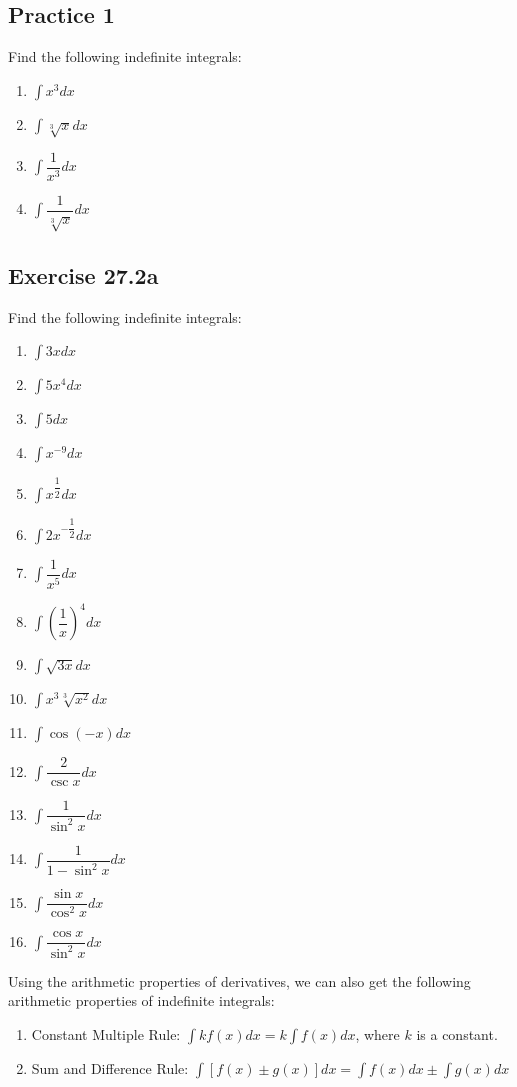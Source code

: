 \documentclass{report}
\begin{document}
\subsection{Practice 1}
Find the following indefinite integrals:
\begin{enumerate}
    \item $\displaystyle\int x^{3}dx$
    \item $\displaystyle\int{\sqrt[3]{x}}dx$
    \item $\displaystyle\int{\dfrac{1}{x^{3}}}dx$
    \item $\displaystyle\int{\dfrac{1}{\sqrt[3]{x}}}dx$
\end{enumerate}

\subsection{Exercise 27.2a}
Find the following indefinite integrals:
\begin{enumerate}
    \item $\displaystyle\int3xdx$
    \item $\displaystyle\int5x^{4}dx$
    \item $\displaystyle\int5dx$
    \item $\displaystyle\int x^{-9}dx$
    \item $\displaystyle\int x^{\dfrac{1}{2}}dx$
    \item $\displaystyle\int{2x^{-{\dfrac{1}{2}}}dx}$
    \item $\displaystyle\int{\dfrac{1}{x^5}}dx$
    \item $\displaystyle\int{\left(\dfrac{1}{x}\right)}^{4}dx$
    \item $\displaystyle\int{\sqrt{3x}}dx$
    \item $\displaystyle\int{x^3\sqrt[3]{x^2}}dx$
    \item $\displaystyle\int{\cos(-x)}dx$
    \item $\displaystyle\int{\dfrac{2}{\csc x}}dx$
    \item $\displaystyle\int{\dfrac{1}{\sin^2x}}dx$
    \item $\displaystyle\int{\dfrac{1}{1 - \sin^2x}}dx$
    \item $\displaystyle\int{\dfrac{\sin x}{\cos^2x}}dx$
    \item $\displaystyle\int{\dfrac{\cos x}{\sin^2x}}dx$
\end{enumerate}

\newpage

Using the arithmetic properties of derivatives, we can also get the following
arithmetic properties of indefinite integrals:
\begin{mdframed}[style=MyFrame]
    \begin{enumerate}
        \item Constant Multiple Rule: $\displaystyle\int kf(x)dx = k\int f(x)dx$, where $k$
              is a constant.
        \item Sum and Difference Rule: $\displaystyle\int \left[f(x) \pm g(x)\right]dx = \int
                  f(x)dx \pm \int g(x)dx$
    \end{enumerate}
\end{mdframed}
\end{document}
